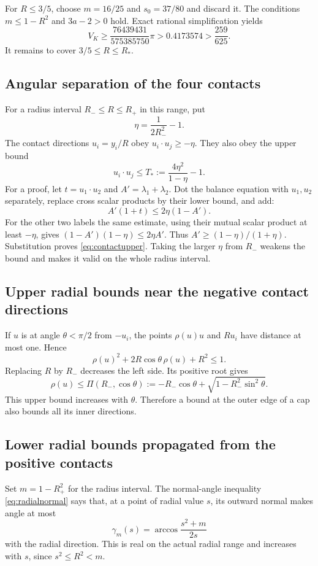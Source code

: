 \documentclass[11pt]{article}
\numberwithin{equation}{section}
\theoremstyle{definition}\newtheorem{definition}[theorem]{Definition}
\theoremstyle{remark}\newtheorem{remark}[theorem]{Remark}
\newcommand{\RS}{R_*}
\begin{document}
For $R\le3/5$, choose $m=16/25$ and $s_0=37/80$ and discard it. The
conditions $m\le1-R^2$ and $3a-2>0$ hold. Exact rational simplification yields
\begin{equation}\label{eq:lowradius}
 V_K\ge\frac{76439431}{575385750}\pi
       >0.4173574>\frac{259}{625}.
\end{equation}
It remains to cover $3/5\le R\le\RS$.

\subsection{Angular separation of the four contacts}
For a radius interval $R_-\le R\le R_+$ in this range, put
\[
 \eta=\frac1{2R_-^2}-1.
\]
The contact directions $u_i=y_i/R$ obey $u_i\cdot u_j\ge-\eta$.
They also obey the upper bound
\begin{equation}\label{eq:contactupper}
 u_i\cdot u_j\le T_*:=\frac{4\eta^2}{1-\eta}-1.
\end{equation}
For a proof, let $t=u_1\cdot u_2$ and $A'=\lambda_1+\lambda_2$.
Dot the balance equation with $u_1,u_2$ separately, replace cross scalar
products by their lower bound, and add:
\[
 A'(1+t)\le2\eta(1-A').
\]
For the other two labels the same estimate, using their mutual scalar
product at least $-\eta$, gives
$(1-A')(1-\eta)\le2\eta A'$. Thus
$A'\ge(1-\eta)/(1+\eta)$. Substitution proves
\cref{eq:contactupper}. Taking the larger $\eta$ from $R_-$ weakens the
bound and makes it valid on the whole radius interval.

\subsection{Upper radial bounds near the negative contact directions}
If $u$ is at angle $\theta<\pi/2$ from $-u_i$, the points $\rho(u)u$ and
$Ru_i$ have distance at most one. Hence
\[
 \rho(u)^2+2R\cos\theta\,\rho(u)+R^2\le1.
\]
Replacing $R$ by $R_-$ decreases the left side. Its positive root gives
\begin{equation}\label{eq:negativecap}
 \rho(u)\le\Pi(R_-,\cos\theta):=
       -R_-\cos\theta+\sqrt{1-R_-^2\sin^2\theta}.
\end{equation}
This upper bound increases with $\theta$. Therefore a bound at the outer
edge of a cap also bounds all its inner directions.

\subsection{Lower radial bounds propagated from the positive contacts}
Set $m=1-R_+^2$ for the radius interval. The normal-angle inequality
\cref{eq:radialnormal} says that, at a point of radial value $s$, its outward
normal makes angle at most
\[
 \gamma_m(s)=\arccos\frac{s^2+m}{2s}
\]
with the radial direction. This is real on the actual radial range and
increases with $s$, since $s^2\le R^2<m$.
\end{document}
